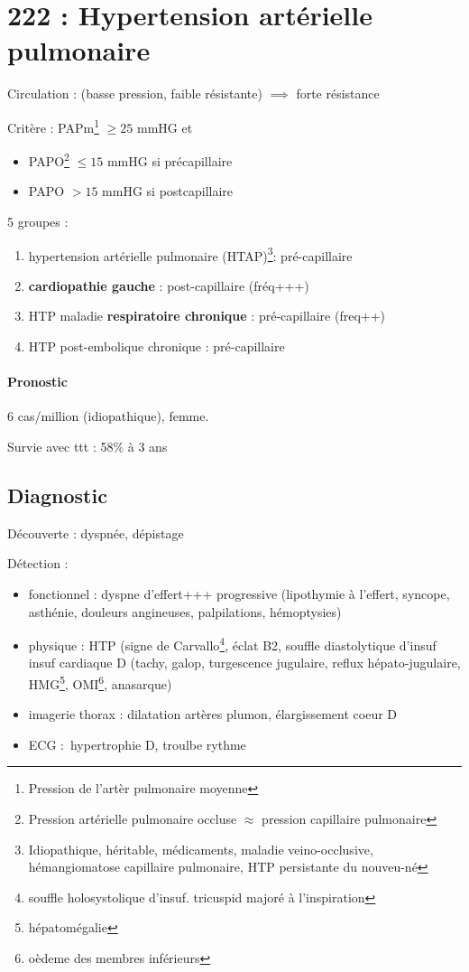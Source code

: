 \documentclass{article}
\begin{document}
\section{222 : Hypertension artérielle pulmonaire}%
\label{sec:hypertension_arterielle_pulmonaire}

Circulation : (basse pression, faible résistante) $\implies$ forte résistance

Critère : PAPm\footnote{Pression de l'artèr pulmonaire moyenne} $\ge 25$ mmHG et 
\begin{itemize}
  \item PAPO\footnote{Pression artérielle pulmonaire occluse $\approx$ pression
    capillaire pulmonaire} $\le 15$ mmHG si précapillaire
  \item PAPO $> 15$ mmHG si postcapillaire
\end{itemize}
5 groupes : 
\begin{enumerate}
  \item hypertension artérielle pulmonaire (HTAP)\footnote{Idiopathique,
      héritable, médicaments, maladie veino-occlusive, hémangiomatose capillaire
    pulmonaire, HTP persistante du nouveu-né}: pré-capillaire
  \item \textbf{cardiopathie gauche}  : post-capillaire (fréq+++)
  \item HTP maladie \textbf{respiratoire chronique}  : pré-capillaire (freq++)
  \item HTP post-embolique chronique : pré-capillaire
\end{enumerate}

\paragraph{Pronostic}
6 cas/million (idiopathique), femme.

Survie avec ttt : 58\% à 3 ans

\subsection{Diagnostic}
Découverte : dyspnée, dépistage

Détection :
\begin{itemize}
  \item fonctionnel : dyspne d'effert+++ progressive (lipothymie à l'effert,
    syncope, asthénie, douleurs angineuses, palpilations, hémoptysies)
  \item physique : 
    HTP (signe de Carvallo\footnote{souffle holosystolique
    d'insuf. tricuspid majoré à l'inspiration}, éclat B2, souffle diastolytique
    d'insuf\\
    insuf cardiaque D (tachy, galop, turgescence jugulaire, reflux
    hépato-jugulaire, HMG\footnote{hépatomégalie}, OMI\footnote{oèdeme des
    membres inférieurs}, anasarque)
  \item imagerie thorax : dilatation artères plumon, élargissement coeur D
  \item ECG : hypertrophie D, troulbe rythme
\end{itemize}
\end{document}
